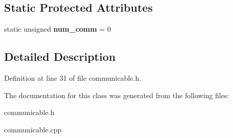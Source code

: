 \subsection*{Static Protected Attributes}
\begin{CompactItemize}
\item 
static unsigned {\bf num\_\-comm} = 0\label{class_communicable_7a6acfdc781a67c9c0ec4f17893f86c3}

\end{CompactItemize}


\subsection{Detailed Description}




Definition at line 31 of file communicable.h.

The documentation for this class was generated from the following files:\begin{CompactItemize}
\item 
communicable.h\item 
communicable.cpp\end{CompactItemize}

